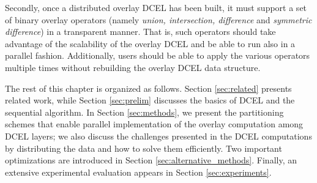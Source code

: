 
Secondly, once a distributed overlay DCEL has been built, it must support a set of binary overlay operators (namely \textit{union, intersection, difference} and \textit{symmetric difference}) in a transparent manner.  That is, such operators should take advantage of the scalability of the overlay DCEL and be able to run also in a parallel fashion. Additionally, users should be able to apply the various operators multiple times without rebuilding the overlay DCEL data structure.  


The rest of this chapter is organized as follows. Section \ref{sec:related} presents related work, while Section \ref{sec:prelim} discusses the basics of DCEL and the sequential algorithm. In Section \ref{sec:methods}, we present the partitioning schemes that enable parallel implementation of the overlay computation among DCEL layers; we also discuss the challenges presented in the DCEL computations by distributing the data and how to solve them efficiently. Two important optimizations are introduced in Section \ref{sec:alternative_methods}. Finally, an extensive experimental evaluation appears in Section \ref{sec:experiments}.

